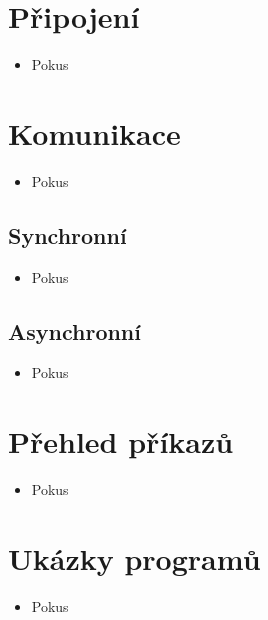 \documentclass{beamer}
\begin{document}
\section{Připojení}

\begin{frame}[t]
    \begin{itemize}
        \item Pokus
    \end{itemize}
\end{frame}

\section{Komunikace}

\begin{frame}
    \begin{itemize}
        \item Pokus
    \end{itemize}
\end{frame}

\subsection{Synchronní}

\begin{frame}
    \begin{itemize}
        \item Pokus
    \end{itemize}
\end{frame}

\subsection{Asynchronní}

\begin{frame}
    \begin{itemize}
        \item Pokus
    \end{itemize}
\end{frame}

\section{Přehled příkazů}

\begin{frame}
    \begin{itemize}
        \item Pokus
    \end{itemize}
\end{frame}

\section{Ukázky programů}

\begin{frame}
    \begin{itemize}
        \item Pokus
    \end{itemize}
\end{frame}
\end{document}
